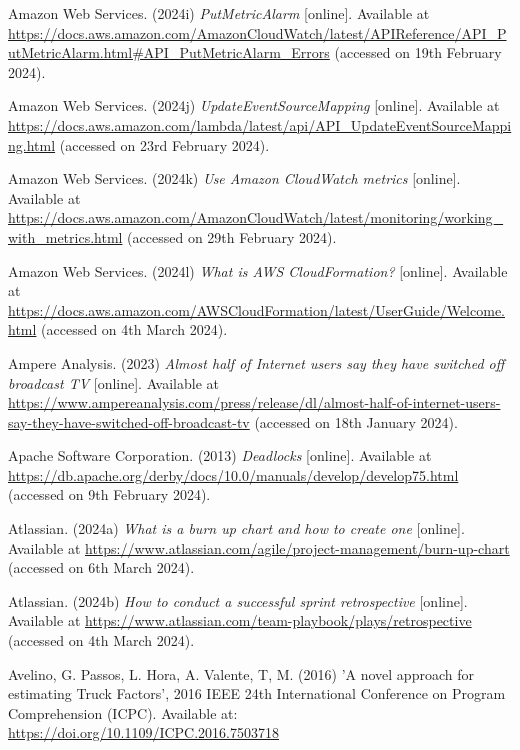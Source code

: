 \noindent Amazon Web Services. (2024i) \textit{PutMetricAlarm} [online]. Available at \url{https://docs.aws.amazon.com/AmazonCloudWatch/latest/APIReference/API_PutMetricAlarm.html#API_PutMetricAlarm_Errors} (accessed on 19th February 2024).
\vspace{0.2cm}

\noindent Amazon Web Services. (2024j) \textit{UpdateEventSourceMapping} [online]. Available at \url{https://docs.aws.amazon.com/lambda/latest/api/API_UpdateEventSourceMapping.html} (accessed on 23rd February 2024).
\vspace{0.2cm}

\noindent Amazon Web Services. (2024k) \textit{Use Amazon CloudWatch metrics} [online]. Available at \url{https://docs.aws.amazon.com/AmazonCloudWatch/latest/monitoring/working_with_metrics.html} (accessed on 29th February 2024).
\vspace{0.2cm}

\noindent Amazon Web Services. (2024l) \textit{What is AWS CloudFormation?} [online]. Available at \url{https://docs.aws.amazon.com/AWSCloudFormation/latest/UserGuide/Welcome.html} (accessed on 4th March 2024).
\vspace{0.2cm}

\noindent Ampere Analysis. (2023) \textit{Almost half of Internet users say they have switched off broadcast TV} [online]. Available at \url{https://www.ampereanalysis.com/press/release/dl/almost-half-of-internet-users-say-they-have-switched-off-broadcast-tv} (accessed on 18th January 2024).
\vspace{0.2cm}

\noindent Apache Software Corporation. (2013) \textit{Deadlocks} [online]. Available at \url{https://db.apache.org/derby/docs/10.0/manuals/develop/develop75.html} (accessed on 9th February 2024).
\vspace{0.2cm}

\noindent Atlassian. (2024a) \textit{What is a burn up chart and how to create one} [online]. Available at \url{https://www.atlassian.com/agile/project-management/burn-up-chart} (accessed on 6th March 2024).
\vspace{0.2cm}

\noindent Atlassian. (2024b) \textit{How to conduct a successful sprint retrospective} [online]. Available at \url{https://www.atlassian.com/team-playbook/plays/retrospective} (accessed on 4th March 2024).
\vspace{0.2cm}

\noindent Avelino, G. Passos, L. Hora, A. Valente, T, M. (2016) 'A novel approach for estimating Truck Factors', 2016 IEEE 24th International Conference on Program Comprehension (ICPC). Available at: \url{https://doi.org/10.1109/ICPC.2016.7503718}
\vspace{0.2cm}

